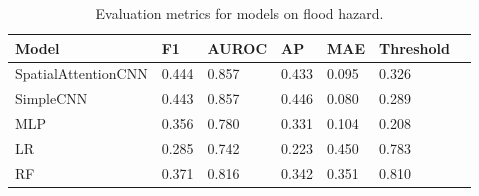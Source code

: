 \begin{table}[h!]
    \centering
    \begin{tabularx}{0.8\textwidth}{@{}lXXXXXX@{}}
    \toprule
    \textbf{Model} & \textbf{F1} & \textbf{AUROC} & \textbf{AP} & \textbf{MAE} & \textbf{Threshold} \\
    \midrule
    SpatialAttentionCNN & 0.444 & 0.857 & 0.433 & 0.095 & 0.326 \\
    SimpleCNN & 0.443 & 0.857 & 0.446 & 0.080 & 0.289 \\
    MLP & 0.356 & 0.780 & 0.331 & 0.104 & 0.208 \\
    LR & 0.285 & 0.742 & 0.223 & 0.450 & 0.783 \\
    RF & 0.371 & 0.816 & 0.342 & 0.351 & 0.810 \\
    \bottomrule
    \end{tabularx}
    \caption{Evaluation metrics for models on flood hazard.}
    \label{tab:evaluation_metrics}
\end{table}
